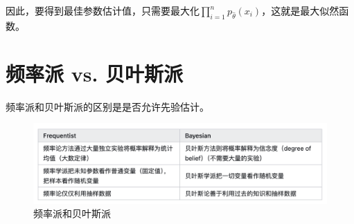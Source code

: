 因此，要得到最佳参数估计值，只需要最大化$\prod\limits_{i=1}^{n}p_{\hat{\theta}}(x_i)$，这就是最大似然函数。

\section{频率派 vs. 贝叶斯派}

频率派和贝叶斯派的区别是是否允许先验估计。
\begin{figure}[H]
    \centering
    \includegraphics[scale=0.3]{figures/频率派和贝叶斯派.png}
    \caption{频率派和贝叶斯派}
\end{figure}



